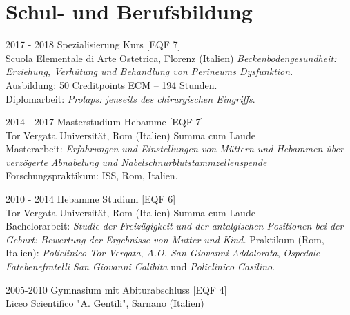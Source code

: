 \documentclass[11pt]{friggeri-cv}
\begin{document}
\vspace{20pt}
\section{Schul- und Berufsbildung}
\begin{entrylist}
  \entry
  {2017 - 2018}
  {Spezialisierung Kurs [EQF 7]}
  {\\Scuola Elementale di Arte Ostetrica, Florenz (Italien)}
  {\emph{
      Beckenbodengesundheit: Erziehung, Verhütung und Behandlung
      von Perineums Dysfunktion}. \\
    Ausbildung: 50 Creditpoints ECM – 194 Stunden.\\ 
    Diplomarbeit: \emph{Prolaps: jenseits des chirurgischen Eingriffs}.\\
  }

  \entry
  {2014 - 2017}
  {Masterstudium Hebamme [EQF 7]}
  {\\Tor Vergata Universit\"{a}t, Rom (Italien)}
  {
    Summa cum Laude\\
    Masterarbeit: \emph{
      Erfahrungen und Einstellungen von
      M\"{u}ttern und Hebammen \"{u}ber verz\"{o}gerte Abnabelung
      und Nabelschnurblutstammzellenspende}  
    Forschungspraktikum: ISS, Rom, Italien.\\
  }
  
  \entry
  {2010 - 2014}
  {Hebamme Studium [EQF 6]}
  {\\Tor Vergata Universit\"{a}t, Rom (Italien)}
  {
    Summa cum Laude\\
    Bachelorarbeit: \emph{
      Studie der Freiz\"{u}gigkeit und der antalgischen
      Positionen bei der Geburt: Bewertung der Ergebnisse von Mutter und Kind.}
    Praktikum (Rom, Italien):
    \emph{Policlinico Tor Vergata},
    \emph{A.O. San Giovanni Addolorata}, 
    \emph{Ospedale Fatebenefratelli San Giovanni Calibita} und 
    \emph{Policlinico Casilino}.\\
  }
  
  \entry
  {2005-2010}
  {Gymnasium mit Abiturabschluss [EQF 4]}
  {\\Liceo Scientifico "A. Gentili", Sarnano (Italien)}
  {\\}
\end{entrylist}
\end{document}
